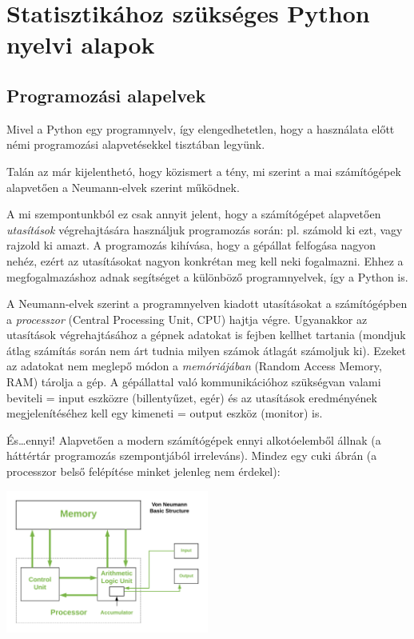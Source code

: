 \documentclass[
]{book}
\begin{document}
\chapter{Statisztikához szükséges Python nyelvi alapok}\label{statisztikuxe1hoz-szuxfcksuxe9ges-python-nyelvi-alapok}

\section{Programozási alapelvek}\label{programozuxe1si-alapelvek}

Mivel a Python egy programnyelv, így elengedhetetlen, hogy a használata előtt némi programozási alapvetésekkel tisztában legyünk.

Talán az már kijelenthetó, hogy közismert a tény, mi szerint a mai számítógépek alapvetően a Neumann-elvek szerint működnek.

A mi szempontunkból ez csak annyit jelent, hogy a számítógépet alapvetően \emph{utasítások} végrehajtására használjuk programozás során: pl. számold ki ezt, vagy rajzold ki amazt. A programozás kihívása, hogy a gépállat felfogása nagyon nehéz, ezért az utasításokat nagyon konkrétan meg kell neki fogalmazni. Ehhez a megfogalmazáshoz adnak segítséget a különböző programnyelvek, így a Python is.

A Neumann-elvek szerint a programnyelven kiadott utasításokat a számítógépben a \emph{processzor} (Central Processing Unit, CPU) hajtja végre. Ugyanakkor az utasítások végrehajtásához a gépnek adatokat is fejben kellhet tartania (mondjuk átlag számítás során nem árt tudnia milyen számok átlagát számoljuk ki). Ezeket az adatokat nem meglepő módon a \emph{memóriájában} (Random Access Memory, RAM) tárolja a gép.
A gépállattal való kommunikációhoz szükségvan valami beviteli = input eszközre (billentyűzet, egér) és az utasítások eredményének megjelenítéséhez kell egy kimeneti = output eszköz (monitor) is.

És\ldots ennyi! Alapvetően a modern számítógépek ennyi alkotóelemből állnak (a háttértár programozás szempontjából irreleváns).
Mindez egy cuki ábrán (a processzor belső felépítése minket jelenleg nem érdekel):

\includegraphics[width=0.5\textwidth,height=\textheight]{neumann.png}
\end{document}
